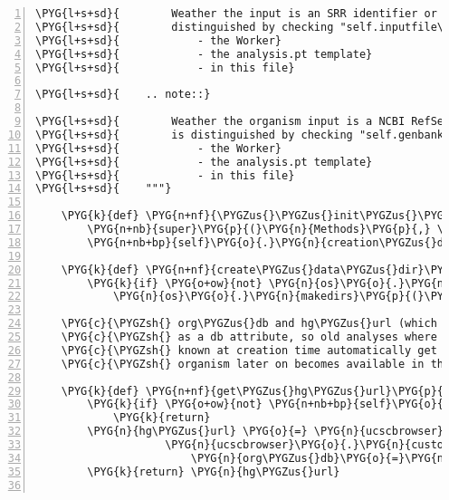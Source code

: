 \begin{Verbatim}[commandchars=\\\{\},numbers=left,firstnumber=1,stepnumber=5]
\PYG{l+s+sd}{        Weather the input is an SRR identifier or a sra/fastq file is}
\PYG{l+s+sd}{        distinguished by checking "self.inputfile\PYGZus{}name == None" in at least}
\PYG{l+s+sd}{            - the Worker}
\PYG{l+s+sd}{            - the analysis.pt template}
\PYG{l+s+sd}{            - in this file}

\PYG{l+s+sd}{    .. note::}

\PYG{l+s+sd}{        Weather the organism input is a NCBI RefSeq accession or a genbank file}
\PYG{l+s+sd}{        is distinguished by checking "self.genbankfile\PYGZus{}name == None" in at least}
\PYG{l+s+sd}{            - the Worker}
\PYG{l+s+sd}{            - the analysis.pt template}
\PYG{l+s+sd}{            - in this file}
\PYG{l+s+sd}{    """}

    \PYG{k}{def} \PYG{n+nf}{\PYGZus{}\PYGZus{}init\PYGZus{}\PYGZus{}}\PYG{p}{(}\PYG{n+nb+bp}{self}\PYG{p}{,} \PYG{o}{*}\PYG{o}{*}\PYG{n}{kwargs}\PYG{p}{)}\PYG{p}{:}
        \PYG{n+nb}{super}\PYG{p}{(}\PYG{n}{Methods}\PYG{p}{,} \PYG{n+nb+bp}{self}\PYG{p}{)}\PYG{o}{.}\PYG{n}{\PYGZus{}\PYGZus{}init\PYGZus{}\PYGZus{}}\PYG{p}{(}\PYG{o}{*}\PYG{o}{*}\PYG{n}{kwargs}\PYG{p}{)}
        \PYG{n+nb+bp}{self}\PYG{o}{.}\PYG{n}{creation\PYGZus{}date} \PYG{o}{=} \PYG{n}{datetime}\PYG{o}{.}\PYG{n}{datetime}\PYG{o}{.}\PYG{n}{utcnow}\PYG{p}{(}\PYG{p}{)}

    \PYG{k}{def} \PYG{n+nf}{create\PYGZus{}data\PYGZus{}dir}\PYG{p}{(}\PYG{n+nb+bp}{self}\PYG{p}{)}\PYG{p}{:}
        \PYG{k}{if} \PYG{o+ow}{not} \PYG{n}{os}\PYG{o}{.}\PYG{n}{path}\PYG{o}{.}\PYG{n}{isdir}\PYG{p}{(}\PYG{n+nb+bp}{self}\PYG{o}{.}\PYG{n}{data\PYGZus{}dir}\PYG{p}{)}\PYG{p}{:}
            \PYG{n}{os}\PYG{o}{.}\PYG{n}{makedirs}\PYG{p}{(}\PYG{n+nb+bp}{self}\PYG{o}{.}\PYG{n}{data\PYGZus{}dir}\PYG{p}{)}

    \PYG{c}{\PYGZsh{} org\PYGZus{}db and hg\PYGZus{}url (which depends upon org\PYGZus{}db) are not set}
    \PYG{c}{\PYGZsh{} as a db attribute, so old analyses where the organism was not}
    \PYG{c}{\PYGZsh{} known at creation time automatically get the right url set if the}
    \PYG{c}{\PYGZsh{} organism later on becomes available in the UCSC Browser}

    \PYG{k}{def} \PYG{n+nf}{get\PYGZus{}hg\PYGZus{}url}\PYG{p}{(}\PYG{n+nb+bp}{self}\PYG{p}{,} \PYG{n}{org\PYGZus{}db}\PYG{p}{)}\PYG{p}{:}
        \PYG{k}{if} \PYG{o+ow}{not} \PYG{n+nb+bp}{self}\PYG{o}{.}\PYG{n}{galaxy\PYGZus{}hg\PYGZus{}text}\PYG{p}{:}
            \PYG{k}{return}
        \PYG{n}{hg\PYGZus{}url} \PYG{o}{=} \PYG{n}{ucscbrowser}\PYG{o}{.}\PYG{n}{custom\PYGZus{}track\PYGZus{}url} \PYG{o}{+} \PYGZbs{}
                    \PYG{n}{ucscbrowser}\PYG{o}{.}\PYG{n}{custom\PYGZus{}track\PYGZus{}params}\PYG{o}{.}\PYG{n}{format}\PYG{p}{(}
                        \PYG{n}{org\PYGZus{}db}\PYG{o}{=}\PYG{n}{org\PYGZus{}db}\PYG{p}{,} \PYG{n}{track\PYGZus{}url}\PYG{o}{=}\PYG{n}{quote}\PYG{p}{(}\PYG{n+nb+bp}{self}\PYG{o}{.}\PYG{n}{hg\PYGZus{}url}\PYG{p}{)}\PYG{p}{)}
        \PYG{k}{return} \PYG{n}{hg\PYGZus{}url}


\end{Verbatim}
